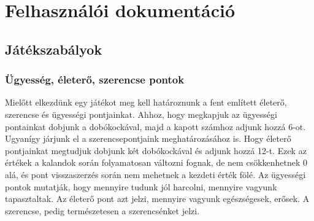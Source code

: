\documentclass[12pt,a4paper,oneside]{report}
\begin{document}
\chapter{Felhasználói dokumentáció}

    \section{Játékszabályok}
  
      \subsection{Ügyesség, életerő, szerencse pontok}
        Mielőtt elkezdünk egy játékot meg kell határoznunk a fent említett
        életerő, szerencse és ügyességi pontjainkat. Ahhoz, hogy megkapjuk az
        ügyességi pontainkat dobjunk a dobókockával, majd a kapott számhoz
        adjunk hozzá 6-ot. Ugyanígy járjunk el a szerencsepontjaink
        meghatározásához is. Hogy életerő pontjainkat megtudjuk dobjunk két
        dobókockával és adjunk hozzá 12-t. Ezek az értékek a kalandok során
        folyamatosan változni fognak, de nem csökkenhetnek 0 alá, és pont
        visszaszerzés során nem mehetnek a kezdeti érték fölé. Az ügyességi
        pontok mutatják, hogy mennyire tudunk jól harcolni, mennyire vagyunk
        tapasztaltak. Az életerő pont azt jelzi, mennyire vagyunk
        egészségesek, erősek. A szerencse, pedig természetesen a szerencsénket
        jelzi.
    
\end{document}
